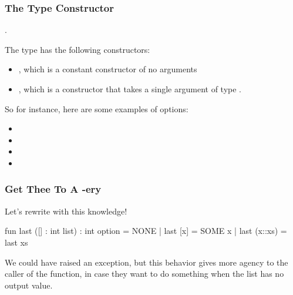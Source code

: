 \documentclass[aspectratio=169]{beamer}
\begin{document}
\begin{frame}[fragile]
  \frametitle{The  Type Constructor}

  \tgs

  .

  \pause
  \vspace{\fill}

  The type  has the following constructors:
  \pause
  \begin{itemize}
    \item {}, which is a constant constructor of no arguments \pause
    \item {}, which is a constructor that takes
    a single argument of type .
  \end{itemize}

  \pause
  \vspace{\fill}

  So for instance, here are some examples of options:
  \begin{itemize}
    \item {}
    \item {}
    \item {}
    \item {}
  \end{itemize}
\end{frame}

\begin{frame}[fragile]
  \frametitle{Get Thee To A -ery}

  Let's rewrite  with this knowledge!

  \pause
  \vspace{\fill}

  \begin{codeblock}
    fun last ([] : int list) : int option = NONE
      | last [x] = SOME x
      | last (x::xs) = last xs
  \end{codeblock}

  \pause
  \vspace{\fill}

  We could have raised an exception, but this behavior gives more
  agency to the caller of the function, in case they want to do something
  when the list has no output value.
\end{frame}
\end{document}
